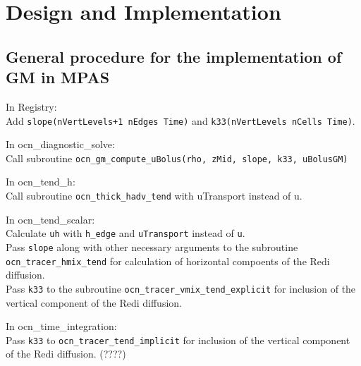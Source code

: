 \documentclass[12pt]{report}
\begin{document}



\chapter{Design and Implementation}\label{cha:design-impl}

\section{General procedure for the implementation of GM in MPAS }\label{sec:code-changes}
\noindent In Registry:\\
Add {\tt slope(nVertLevels+1 nEdges Time)} and {\tt k33(nVertLevels nCells Time)}.

\vspace{5mm}
\noindent In ocn\_diagnostic\_solve:\\
Call subroutine {\tt ocn\_gm\_compute\_uBolus(rho, zMid, slope, k33, uBolusGM)}

\vspace{5mm}
\noindent In ocn\_tend\_h:\\
Call subroutine {\tt ocn\_thick\_hadv\_tend} with uTransport instead of u.

\vspace{5mm}
\noindent In ocn\_tend\_scalar:\\
Calculate {\tt uh} with {\tt h\_edge} and {\tt uTransport} instead of
{\tt u}.\\
Pass {\tt slope} along with other necessary arguments to
the subroutine {\tt ocn\_tracer\_hmix\_tend} for calculation of horizontal
compoents of the Redi diffusion.\\
Pass {\tt k33} to the subroutine {\tt ocn\_tracer\_vmix\_tend\_explicit} for inclusion
of the vertical component of the Redi diffusion.

\vspace{5mm}
\noindent In ocn\_time\_integration:\\
Pass {\tt k33} to {\tt ocn\_tracer\_tend\_implicit} for inclusion of the vertical
component of the Redi diffusion. (????)
\end{document}
